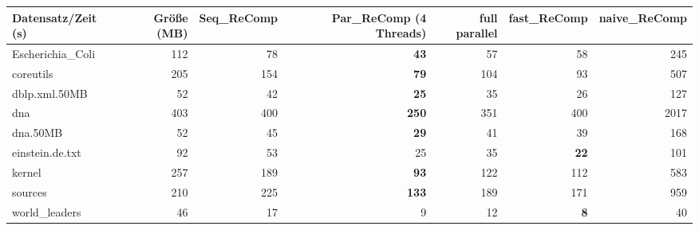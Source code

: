 \documentclass[10pt,a4paper]{standalone}
\begin{document}
	
	
	\begin{tabular}{l|r|r|r|r|r|r}
		Datensatz/Zeit (s) & Größe (MB) & Seq\_ReComp & Par\_ReComp (4 Threads) & full parallel & fast\_ReComp & naive\_ReComp \\ \hline
  Escherichia\_Coli & 112 &  78 &  \textbf{43} &  57 &          58 &  245 \\
          coreutils & 205 & 154 &  \textbf{79} & 104 &          93 &  507 \\
      dblp.xml.50MB &  52 &  42 &  \textbf{25} &  35 &          26 &  127 \\
                dna & 403 & 400 & \textbf{250} & 351 &         400 & 2017 \\
           dna.50MB &  52 &  45 &  \textbf{29} &  41 &          39 &  168 \\
    einstein.de.txt &  92 &  53 &           25 &  35 & \textbf{22} &  101 \\
             kernel & 257 & 189 &  \textbf{93} & 122 &         112 &  583 \\
            sources & 210 & 225 & \textbf{133} & 189 &         171 &  959 \\
     world\_leaders &  46 &  17 &            9 &  12 &  \textbf{8} &   40 \\
	\end{tabular}
\end{document}
